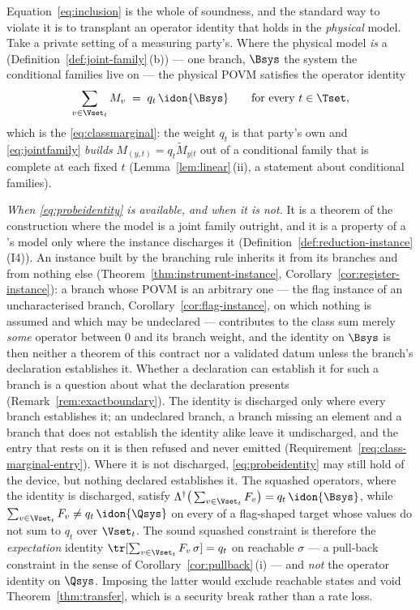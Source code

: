\begin{remark}
\label{rem:unsound}
Equation~\eqref{eq:inclusion} is the whole of soundness, and the standard way
to violate it is to transplant an operator identity that holds in the
\emph{physical} model. Take a private setting of a measuring party's. Where the physical
model \emph{is} a  (Definition~\ref{def:joint-family}\,(b)) ---
one branch, $\Bsys$ the system the conditional families live on --- the
physical POVM satisfies the operator identity
\begin{equation}\label{eq:probeidentity}
  \sum_{v\in\Vset_t}M_v\;=\;q_t\,\idon{\Bsys}
  \qquad\text{for every }t\in\Tset ,
\end{equation}
which is the  \eqref{eq:classmarginal}: the
weight $q_t$ is that party's own and
\eqref{eq:jointfamily} \emph{builds} $M_{(y,t)}=q_t\widetilde M_{y|t}$ out of
a conditional family that is complete at each fixed $t$
(Lemma~\ref{lem:linear}\,(ii), a statement about conditional families).

\emph{When \eqref{eq:probeidentity} is available, and when it is not.} It is
a theorem of the construction where the model is a joint family outright, and
it is a property of a 's model only where the instance
discharges it (Definition~\ref{def:reduction-instance}\,(I4)). An instance built by the
branching rule inherits it from its branches and from nothing else
(Theorem~\ref{thm:instrument-instance}, Corollary~\ref{cor:register-instance}):
a branch whose POVM is an arbitrary one --- the flag instance of an
uncharacterised branch, Corollary~\ref{cor:flag-instance}, on which nothing
is assumed and which may be undeclared --- contributes to the class sum
merely \emph{some} operator between $0$ and its branch weight, and the
identity on $\Bsys$ is then neither a theorem of this contract nor a
validated datum unless the branch's declaration establishes it. Whether a
declaration can establish it for such a branch is a question about what the
declaration presents (Remark~\ref{rem:exactboundary}). The identity is
discharged only where every branch establishes it; an undeclared branch, a
branch missing an element and a branch that does not establish the identity
alike leave it undischarged, and the entry that rests on it is then refused
and never emitted (Requirement~\ref{req:class-marginal-entry}). Where it is
not discharged, \eqref{eq:probeidentity} may still hold of the device, but
nothing declared establishes it. The squashed operators, where the identity
is discharged, satisfy
$\Lambda^{\dagger}\big(\sum_{v\in\Vset_t}F_v\big)=q_t\,\idon{\Bsys}$, while
$\sum_{v\in\Vset_t}F_v\ne q_t\,\idon{\Qsys}$ on every  of a
flag-shaped target whose values do not sum to $q_t$ over $\Vset_t$. The sound squashed
constraint is therefore the \emph{expectation} identity
$\tr[\sum_{v\in\Vset_t}F_v\,\sigma]=q_t$ on reachable $\sigma$ --- a
pull-back constraint in the sense of Corollary~\ref{cor:pullback}\,(i) ---
and \emph{not} the operator identity on $\Qsys$. Imposing the latter would
exclude reachable states and void Theorem~\ref{thm:transfer}, which is a
security break rather than a rate loss.


\end{remark}
